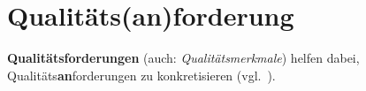 \section{Qualitäts(an)forderung}

\begin{tcolorbox}[title=Qualitätsforderung/Qualitätsanforderung]
    \textbf{Qualitätsforderungen} (auch: \textit{Qualitätsmerkmale}) helfen dabei, Qualitäts\textbf{an}forderungen zu konkretisieren (vgl.~\cite[58]{Wed09}).
\end{tcolorbox}